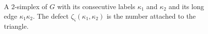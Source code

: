 \begin{figure}[ht]
	\centering
	\caption{A $2$-simplex of $G$ with its consecutive labels $\kappa_1$ and $\kappa_2$ and its long edge $\kappa_1\kappa_2$. The defect $\zeta_\varsigma(\kappa_1,\kappa_2)$ is the number attached to the triangle.}
	\label{fig:triangle}
\end{figure}

